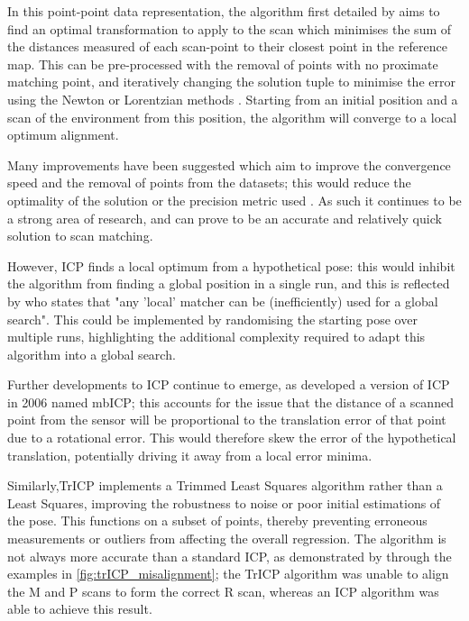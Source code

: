 \documentclass[authoryearcitations]{UoYCSproject}
\begin{document}
In this point-point data representation, the algorithm first detailed by \citet{Besl1992-pd} aims to find an optimal transformation to apply to the scan which minimises the sum of the distances measured of each scan-point to their closest point in the reference map. This can be pre-processed with the removal of points with no proximate matching point, and iteratively changing the solution tuple to minimise the error using the Newton or Lorentzian methods \cite{Munoz2005-gt}. Starting from an initial position and a scan of the environment from this position, the algorithm will converge to a local optimum alignment. \newline

Many improvements have been suggested \cite{Donoso2017-wp} which aim to improve the convergence speed \cite{Donoso2017-wp} \cite{Simon1996-dl} and the removal of points from the datasets; this would reduce the optimality of the solution \cite{Weik1997-px} \cite{Masuda1996-av} or the precision metric used \cite{Eggert1997-ak}. As such it continues to be a strong area of research, and can prove to be an accurate and relatively quick solution to scan matching.\newline

However, ICP finds a local optimum from a hypothetical pose: this would inhibit the algorithm from finding a global position in a single run, and this is reflected by \citet{Censi2005-iv} who states that "any 'local' matcher can be (inefficiently) used for a global search". This could be implemented by randomising the starting pose over multiple runs, highlighting the additional complexity required to adapt this algorithm into a global search.\newline

Further developments to ICP continue to emerge, as \citet{Minguez2006-nj} developed a version of ICP in 2006 named mbICP;  this accounts for the issue that the distance of a scanned point from the sensor will be proportional to the translation error of that point due to a rotational error. This would therefore skew the error of the hypothetical translation, potentially driving it away from a local error minima.\newline

Similarly,TrICP \cite{Chetverikov2005-yz} implements a Trimmed Least Squares \cite{Ruppert1980-js} algorithm rather than a Least Squares, improving the robustness to noise or poor initial estimations of the pose. This functions on a subset of points, thereby preventing erroneous measurements or outliers from affecting the overall regression. The algorithm is not always more accurate than a standard ICP, as demonstrated by \citeauthor{Chetverikov2005-yz} through the examples in \autoref{fig:trICP_misalignment}; the TrICP algorithm was unable to align the M and P scans to form the correct R scan, whereas an ICP algorithm was able to achieve this result. \newline
\end{document}
